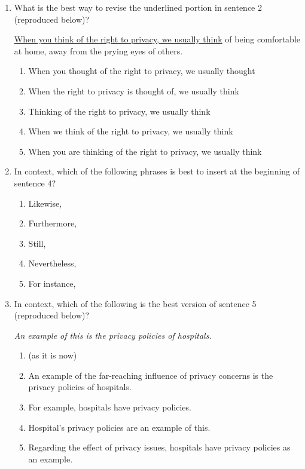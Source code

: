 \begin{enumerate}
\item{What is the best way to revise the underlined portion in sentence 2 (reproduced below)?}

\ul{When you think of the right to privacy, we usually think} of being comfortable at home, away from the prying eyes of others.
\begin{enumerate}[label=(\Alph*)]
\item{When you thought of the right to privacy, we usually thought}
\item{When the right to privacy is thought of, we usually think}
\item{Thinking of the right to privacy, we usually think}
\item{When we think of the right to privacy, we usually think}
\item{When you are thinking of the right to privacy, we usually think}
\end{enumerate}

\newpage
\item{In context, which of the following phrases is best to insert at the beginning of sentence 4?}
\begin{enumerate}[label=(\Alph*)]
\item{Likewise,}
\item{Furthermore,}
\item{Still,}
\item{Nevertheless,}
\item{For instance,}
\end{enumerate}

\bigskip
\item{In context, which of the following is the best version of sentence 5 (reproduced below)?}

\bigskip
\textit{An example of this is the privacy policies of hospitals.}
\begin{enumerate}[label=(\Alph*)]
\item{(as it is now)}
\item{An example of the far-reaching influence of privacy concerns is the privacy policies of hospitals.}
\item{For example, hospitals have privacy policies.}
\item{Hospital's privacy policies are an example of this.}
\item{Regarding the effect of privacy issues, hospitals have privacy policies as an example.}
\end{enumerate}


\end{enumerate}
